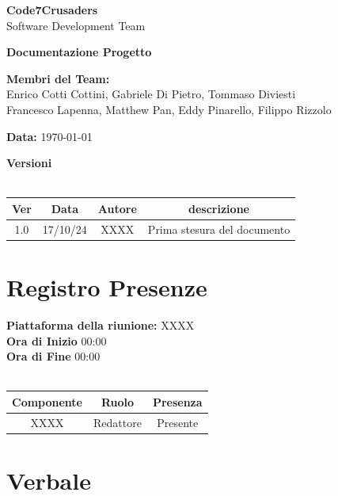 \documentclass{article}
\begin{document}
\begin{titlepage}
    {\Huge \textbf{Code7Crusaders}}\\
    \vspace{0.5cm}
    {\Large Software Development Team}\\
    \vspace{2cm}
    
    {\large \textbf{Documentazione Progetto}}\\
    \vspace{5cm}

    \textbf{Membri del Team:}\\
    Enrico Cotti Cottini, Gabriele Di Pietro, Tommaso Diviesti \\
    Francesco Lapenna, Matthew Pan, Eddy Pinarello, Filippo Rizzolo \\
    \vspace{0.5cm}
    
    {\large \textbf{Data:}} \today\\
    
    \vspace{1cm}
\end{titlepage}

\newpage
\begin{center}
    \textbf{Versioni}
    \\
    \\
    \begin{tabular}{|c|c|c|c|}
        \hline
        \textbf{Ver} & \textbf{Data} & \textbf{Autore} & \textbf{descrizione}\\
        \hline
        1.0 & 17/10/24 & XXXX & Prima stesura del documento \\
        \hline
    \end{tabular}
\end{center}
\newpage
\section{Registro Presenze}
\textbf{Piattaforma della riunione:} XXXX \\
\textbf{Ora di Inizio} 00:00\\
\textbf{Ora di Fine} 00:00\\
\\
\begin{tabular}{|c|c|c|}
    \hline
    \textbf{Componente} & \textbf{Ruolo} & \textbf{Presenza}\\
    \hline
    XXXX & Redattore & Presente \\ %
    \hline %
\end{tabular}
\newpage
\section{Verbale}
\end{document}
